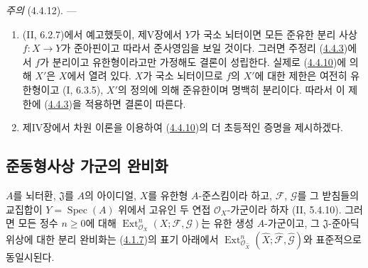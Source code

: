 \begin{env}[4.4.12]
\label{III.4.4.12-fr}
\emph{주의} (4.4.12). ---
\begin{enumerate}
\item[(i)]
(II, 6.2.7)에서 예고했듯이, 제V장에서 $Y$가 국소 뇌터이면 모든
준유한 분리 사상 $f:X\to Y$가 준아핀이고 따라서 준사영임을 보일
것이다. 그러면 주정리 (\hyperref[III.4.4.3-fr]{4.4.3})에서 $f$가
분리이고 유한형이라고만 가정해도 결론이 성립한다. 실제로
(\hyperref[III.4.4.10-fr]{4.4.10})에 의해 $X'$은 $X$에서 열려 있다.
$X$가 국소 뇌터이므로 $f$의 $X'$에 대한 제한은 여전히 유한형이고
(I, 6.3.5), $X'$의 정의에 의해 준유한이며 명백히 분리이다. 따라서
이 제한에 (\hyperref[III.4.4.3-fr]{4.4.3})을 적용하면 결론이 따른다.

\item[(ii)]
제IV장에서 차원 이론을 이용하여
(\hyperref[III.4.4.10-fr]{4.4.10})의 더 초등적인 증명을 제시하겠다.
\end{enumerate}
\end{env}

\subsection{준동형사상 가군의 완비화}
\label{subsection:III.4.5-fr}

\begin{proposition}[4.5.1]
\label{III.4.5.1-fr}
$A$를 뇌터환, $\mathfrak J$를 $A$의 아이디얼, $X$를 유한형
$A$-준스킴이라 하고, $\mathcal F$, $\mathcal G$를 그 받침들의
교집합이 $Y=\operatorname{Spec}(A)$ 위에서 고유인 두 연접
$\mathcal O_X$-가군이라 하자 (II, 5.4.10). 그러면 모든 정수
$n\geq0$에 대해
$\operatorname{Ext}^n_{\mathcal O_X}(X;\mathcal F,\mathcal G)$는 유한 생성
$A$-가군이고, 그 $\mathfrak J$-준아딕 위상에 대한 분리 완비화는
(\hyperref[III.4.1.7-fr]{4.1.7})의 표기 아래에서
$\operatorname{Ext}^n_{\mathcal O_{\widehat X}}(\widehat X;
\widehat{\mathcal F},\widehat{\mathcal G})$와 표준적으로 동일시된다.
\end{proposition}

